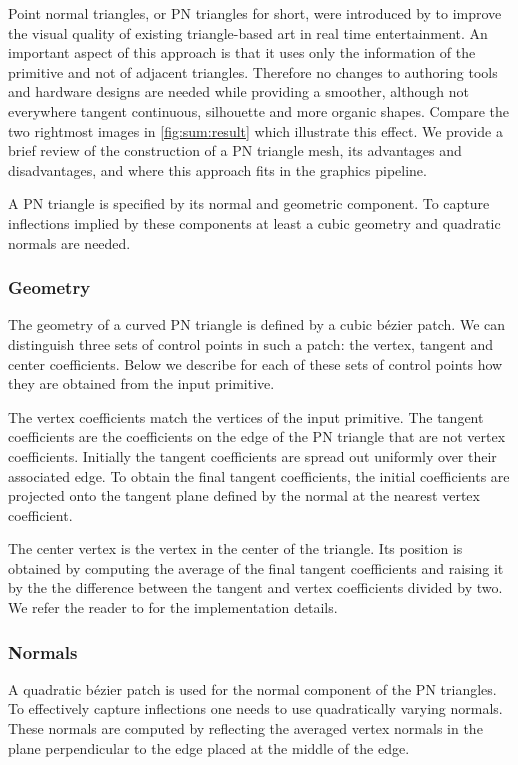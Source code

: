 \noindent Point normal triangles, or PN triangles for short, were introduced by \textcite{vlachos2001curved} to improve the visual quality of existing triangle-based art in real time entertainment. An important aspect of this approach is that it uses only the information of the primitive and not of adjacent triangles. Therefore no changes to authoring tools and hardware designs are needed while providing a smoother, although not everywhere tangent continuous, silhouette and more organic shapes. Compare the two rightmost images in \cref{fig:sum:result} which illustrate this effect. We provide a brief review of the construction of a PN triangle mesh, its advantages and disadvantages, and where this approach fits in the graphics pipeline. 

A PN triangle is specified by its normal and geometric component. To capture inflections implied by these components at least a cubic geometry and quadratic normals are needed.

\subsubsection*{Geometry}
The geometry of a curved PN triangle is defined by a cubic b\'ezier patch. We can distinguish three sets of control points in such a patch: the vertex, tangent and center coefficients. Below we describe for each of these sets of control points how they are obtained from the input primitive. 

The vertex coefficients match the vertices of the input primitive. The tangent coefficients are the coefficients on the edge of the PN triangle that are not vertex coefficients. Initially the tangent coefficients are spread out uniformly over their associated edge. To obtain the final tangent coefficients, the initial coefficients are projected onto the tangent plane defined by the normal at the nearest vertex coefficient. 

The center vertex is the vertex in the center of the triangle. Its position is obtained by computing the average of the final tangent coefficients and raising it by the the difference between the tangent and vertex coefficients divided by two. We refer the reader to \textcite{vlachos2001curved} for the implementation details.

\subsubsection*{Normals}
A quadratic b\'ezier patch is used for the normal component of the PN triangles. To effectively capture inflections one needs to use quadratically varying normals. These normals are computed by reflecting the averaged vertex normals in the plane perpendicular to the edge placed at the middle of the edge.

